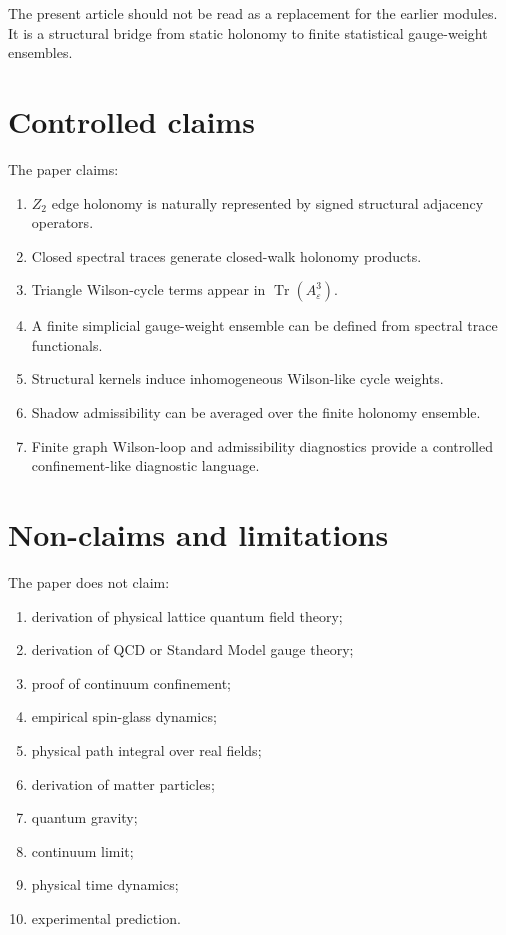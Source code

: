 \documentclass[11pt]{article}
\begin{document}
The present article should not be read as a replacement for the earlier modules. It is a structural bridge from static holonomy to finite statistical gauge-weight ensembles.

\section{Controlled claims}

The paper claims:
\begin{enumerate}[leftmargin=2em]
\item $Z_2$ edge holonomy is naturally represented by signed structural adjacency operators.
\item Closed spectral traces generate closed-walk holonomy products.
\item Triangle Wilson-cycle terms appear in $\operatorname{Tr}(A_\varepsilon^3)$.
\item A finite simplicial gauge-weight ensemble can be defined from spectral trace functionals.
\item Structural kernels induce inhomogeneous Wilson-like cycle weights.
\item Shadow admissibility can be averaged over the finite holonomy ensemble.
\item Finite graph Wilson-loop and admissibility diagnostics provide a controlled confinement-like diagnostic language.
\end{enumerate}

\section{Non-claims and limitations}

The paper does not claim:
\begin{enumerate}[leftmargin=2em]
\item derivation of physical lattice quantum field theory;
\item derivation of QCD or Standard Model gauge theory;
\item proof of continuum confinement;
\item empirical spin-glass dynamics;
\item physical path integral over real fields;
\item derivation of matter particles;
\item quantum gravity;
\item continuum limit;
\item physical time dynamics;
\item experimental prediction.
\end{enumerate}
\end{document}
